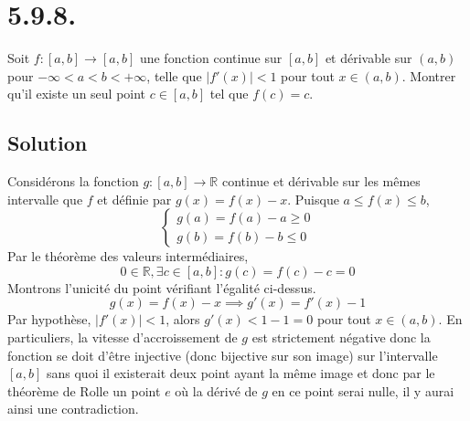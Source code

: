\section*{5.9.8.}
	Soit $f:[a,b]\longrightarrow [a,b]$ une fonction continue sur $[a,b]$ et dérivable sur $(a,b)$ pour $-\infty<a<b<+\infty$, telle que $|f'(x)|<1$ pour tout $x\in (a,b)$. Montrer qu'il existe un seul point $c\in [a,b]$ tel que $f(c)=c$.
	\subsection*{Solution}
		Considérons la fonction $g:[a,b]\longrightarrow\mathbb{R}$ continue et dérivable sur les mêmes intervalle que $f$ et définie par $g(x)=f(x)-x$.  Puisque $a\leq f(x)\leq b$,
		\[\begin{cases}
		g(a)=f(a)-a\geq 0\\
		g(b)=f(b)-b\leq 0
		\end{cases}
		\]
		Par le théorème des valeurs intermédiaires, \[0\in\mathbb{R}, \exists c\in [a,b] : g(c)=f(c)-c = 0 \]
		Montrons l'unicité du point vérifiant l'égalité ci-dessus. \[g(x)=f(x)-x\implies g'(x)=f'(x)-1\]
		Par hypothèse, $|f'(x)|<1$, alors $g'(x)<1-1 = 0$ pour tout $x\in (a,b)$. En particuliers, la vitesse d'accroissement de $g$ est strictement négative donc la fonction se doit d'être injective (donc bijective sur son image) sur l'intervalle $[a,b]$ sans quoi il existerait deux point ayant la même image et donc par le théorème de Rolle un point $e$ où la dérivé de $g$ en ce point serai nulle, il y aurai ainsi une contradiction.